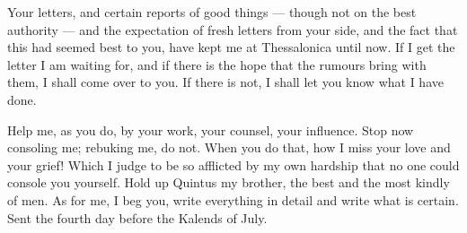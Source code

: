 

 Your letters, and certain reports of good things --- though not on the best authority --- and the expectation of fresh letters from your side, and the fact that this had seemed best to you, have kept me at Thessalonica until now. If I get the letter I am waiting for, and if there is the hope that the rumours bring with them, I shall come over to you. If there is not, I shall let you know what I have done.

 Help me, as you do, by your work, your counsel, your influence. Stop now consoling me; rebuking me, do not. When you do that, how I miss your love and your grief! Which I judge to be so afflicted by my own hardship that no one could console you yourself. Hold up Quintus my brother, the best and the most kindly of men. As for me, I beg you, write everything in detail and write what is certain. Sent the fourth day before the Kalends of July.
